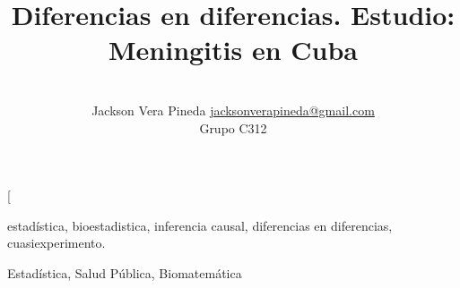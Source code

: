 \documentclass[a4paper,10pt,twocolumn]{article}
\title{Diferencias en diferencias. Estudio: Meningitis en Cuba}
\author{\\
\name Jackson Vera Pineda \email \href{mailto:jacksonverapineda@gmail.com}{jacksonverapineda@gmail.com}
	\\ \addr Grupo C312 
  }
\begin{document}
\twocolumn[

\maketitle


%
%
%
%
%
%

\begin{keywords}
	estadística,
	bioestadistica,
	inferencia causal,
	diferencias en diferencias,
	cuasiexperimento.
\end{keywords}

\begin{topics}
	Estadística, Salud Pública, Biomatemática
\end{topics}
\end{document}
